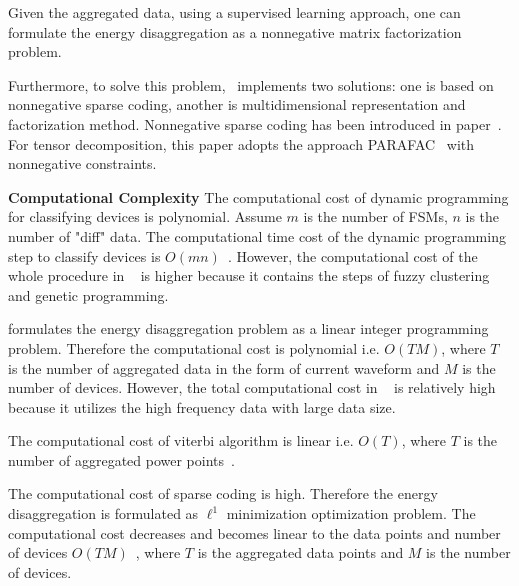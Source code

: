 Given the aggregated data, using a supervised learning approach, one can formulate the energy disaggregation as a nonnegative matrix factorization problem. 

Furthermore, to solve this problem,~\cite{figueiredo2014electrical} implements two solutions: one is based on nonnegative 
sparse coding, another is multidimensional representation and factorization method. 
Nonnegative sparse coding has been introduced in paper~\cite{kolter2010sparse}. 
For tensor decomposition, this paper adopts the approach PARAFAC~\cite{kolda2009tensor} with nonnegative constraints. 

\textbf{Computational Complexity}
The computational cost of dynamic programming for classifying devices 
is polynomial.
Assume $m$ is the number of FSMs, 
$n$ is the number of "diff" data.
The computational time cost of the dynamic programming step to 
classify devices is $O(mn)$~\cite{chow1989complexity}. 
However, the computational cost of the whole procedure in  
~\cite{baranski2004detecting} is higher because 
it contains the steps 
of fuzzy clustering and genetic programming. 

\cite{suzuki2008nonintrusive} formulates the energy disaggregation 
problem as a linear integer programming problem. 
Therefore the computational cost is polynomial i.e. $O(TM)$, %
where $T$ is the number of aggregated data in the form of 
current waveform and 
$M$ is the number of devices. 
However, the total computational cost in  
~\cite{suzuki2008nonintrusive} is relatively high 
because it utilizes the high frequency data with large data size. 

The computational cost of viterbi algorithm is 
linear i.e. $O(T)$, 
where $T$ is the number of aggregated power points~\cite{bishop2006pattern}.

The computational cost of sparse coding is high. 
Therefore the energy disaggregation is formulated as $\ell^1$ 
minimization optimization problem. 
The computational cost decreases and becomes linear to the 
data points and number of devices $O(TM)$~\cite{li2009coordinate}, %
where $T$ is the aggregated data points 
and $M$ is the number of devices. 

